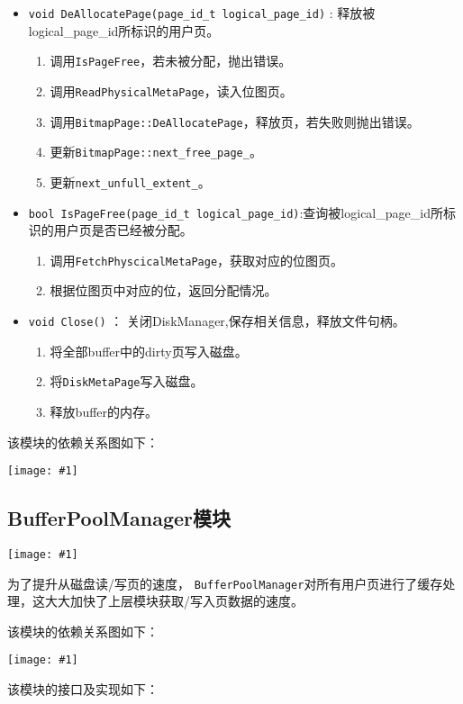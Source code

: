 \documentclass[12pt, a4paper]{article}
\def\c#1{\texttt{#1}}
\def\ss#1{\subsection{#1}}
\def\p{\par}
\def\g#1{\begin{center}\texttt{[image: \#1]}\end{center}}
\def\gm#1{\begin{center}\texttt{[image: \#1]}\end{center}}
\begin{document}
\begin{itemize}
 \item \c{void DeAllocatePage(page\_id\_t logical\_page\_id)} : 释放被logical\_page\_id所标识的用户页。\begin{enumerate}
   \item 调用\c{IsPageFree}，若未被分配，抛出错误。
   \item 调用\c{ReadPhysicalMetaPage}，读入位图页。
   \item 调用\c{BitmapPage::DeAllocatePage}，释放页，若失败则抛出错误。
   \item 更新\c{BitmapPage::next\_free\_page\_}。
   \item 更新\c{next\_unfull\_extent\_}。
 \end{enumerate}
 \item \c{bool IsPageFree(page\_id\_t logical\_page\_id)}:查询被logical\_page\_id所标识的用户页是否已经被分配。\begin{enumerate}
   \item 调用\c{FetchPhyscicalMetaPage}，获取对应的位图页。
   \item 根据位图页中对应的位，返回分配情况。
 \end{enumerate}
 \item \c{void Close()} ： 关闭DiskManager,保存相关信息，释放文件句柄。\begin{enumerate}
   \item 将全部buffer中的dirty页写入磁盘。
   \item 将\c{DiskMetaPage}写入磁盘。
   \item 释放buffer的内存。
 \end{enumerate}
\end{itemize}
\p 该模块的依赖关系图如下：
\g{./dots/DiskManager.pdf}
\ss{BufferPoolManager模块}
\gm{buffer_pool_manager.pdf}
为了提升从磁盘读/写页的速度， \c{BufferPoolManager}对所有用户页进行了缓存处理，这大大加快了上层模块获取/写入页数据的速度。
\p 该模块的依赖关系图如下：
\g{./dots/BufferPoolManager.pdf}
\p 该模块的接口及实现如下：
\end{document}
